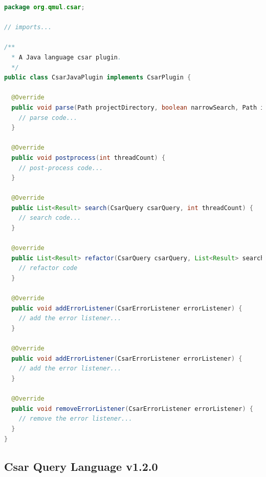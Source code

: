 \documentclass[12pt, letterpaper]{article}
\begin{document}
\begin{lstlisting}[language=Java]
package org.qmul.csar;

// imports...

/**
  * A Java language csar plugin.
  */
public class CsarJavaPlugin implements CsarPlugin {

  @Override
  public void parse(Path projectDirectory, boolean narrowSearch, Path ignoreFile, int threadCount) {
    // parse code...
  }

  @Override
  public void postprocess(int threadCount) {
    // post-process code...
  }

  @Override
  public List<Result> search(CsarQuery csarQuery, int threadCount) {
    // search code...
  }

  @override
  public List<Result> refactor(CsarQuery csarQuery, List<Result> searchResults, int threadCount) {
    // refactor code
  }

  @Override
  public void addErrorListener(CsarErrorListener errorListener) {
    // add the error listener...
  }

  @Override
  public void addErrorListener(CsarErrorListener errorListener) {
    // add the error listener...
  }

  @Override
  public void removeErrorListener(CsarErrorListener errorListener) {
    // remove the error listener...
  }
}
\end{lstlisting}

\subsection{Csar Query Language v1.2.0}
\label{apx:CsarQueryLanguagev120}
\end{document}
